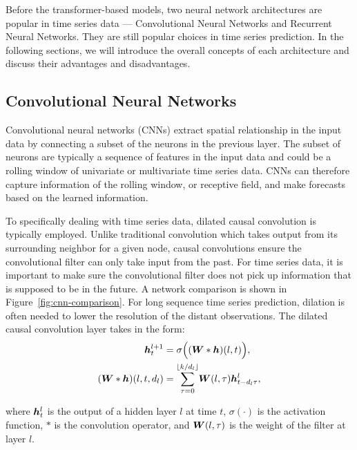 \documentclass{article} %
\begin{document}
Before the transformer-based models, two neural network architectures are popular in time series data --- Convolutional Neural Networks and Recurrent Neural Networks.
They are still popular choices in time series prediction.
In the following sections, we will introduce the overall concepts of each architecture and discuss their advantages and disadvantages.

\subsection{Convolutional Neural Networks}

Convolutional neural networks (CNNs) \citet{10.5555/303568.303704} extract spatial relationship in the input data by connecting a subset of the neurons in the previous layer.
The subset of neurons are typically a sequence of features in the input data and could be a rolling window of univariate or multivariate time series data.
CNNs can therefore capture information of the rolling window, or receptive field, and make forecasts based on the learned information.

To specifically dealing with time series data, dilated causal convolution \citet{oord2016wavenet} is typically employed.
Unlike traditional convolution which takes output from its surrounding neighbor for a given node, causal convolutions ensure the convolutional filter can only take input from the past.
For time series data, it is important to make sure the convolutional filter does not pick up information that is supposed to be in the future.
A network comparison is shown in Figure~\ref{fig:cnn-comparison}.
For long sequence time series prediction, dilation is often needed to lower the resolution of the distant observations.
The dilated causal convolution layer takes in the form:
\begin{align}
        {\bm{h}}_{t}^{l+1} &= \sigma \Big( ({\bm{W}} * {\bm{h}}) (l, t) \Big), \\
        ( {\bm{W}} * {\bm{h}} ) (l, t, d_{l}) &= \overset{\lfloor k/d_{l} \rfloor}{\underset{\tau=0}{\sum}} {\bm{W}} (l, \tau) {\bm{h}}_{t-d_{l}\tau}^{l},
\end{align}

where ${\bm{h}}_{t}^{l}$ is the output of a hidden layer $l$ at time $t$, $\sigma(\cdot)$ is the activation function, $*$ is the convolution operator, and ${\bm{W}}(l, \tau)$ is the weight of the filter at layer $l$.
\end{document}
